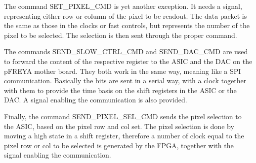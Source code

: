\documentclass[a4paper,twoside]{article}
\begin{document}
	The command SET\_PIXEL\_CMD is yet another exception. It needs a signal, representing either row or column of the pixel to be readout. The data packet is the same as those in the clocks or fast controls, but represents the number of the pixel to be selected. The selection is then sent through the proper command.

	The commands SEND\_SLOW\_CTRL\_CMD and SEND\_DAC\_CMD are used to forward the content of the respective register to the ASIC and the DAC on the pFREYA mother board. They both work in the same way, meaning like a SPI communication. Basically the bits are sent in a serial way, with a clock together with them to provide the time basis on the shift registers in the ASIC or the DAC. A signal enabling the communication is also provided.

	Finally, the command SEND\_PIXEL\_SEL\_CMD sends the pixel selection to the ASIC, based on the pixel row and col set. The pixel selection is done by moving a high state in a shift register, therefore a number of clock equal to the pixel row or col to be selected is generated by the FPGA, together with the signal enabling the communication.

\clearpage
\nocite{*}
\printbibliography
\end{document}
